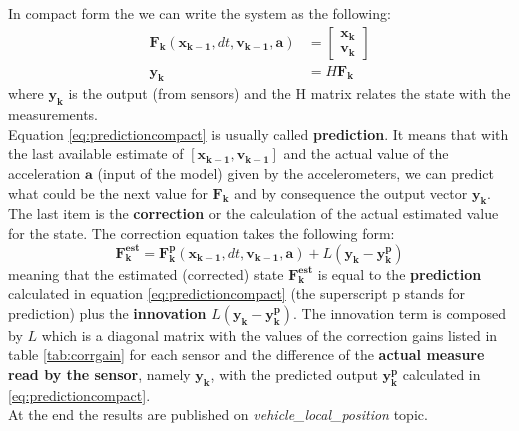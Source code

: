 \noindent
In compact form the we can write the system as the following:
\begin{equation}
	\begin{aligned}
	\boldsymbol{F_k}(\boldsymbol{x_{k-1}}, dt ,\boldsymbol{v_{k-1}}, \boldsymbol{a})& = \begin{bmatrix}\boldsymbol{x_k}\\\boldsymbol{v_k}\end{bmatrix}\\
	\boldsymbol{y_k}& = H \boldsymbol{F_k}
	\end{aligned}
	\label{eq:predictioncompact}
	\end{equation}
where $\boldsymbol{y_k}$ is the output  (from sensors) and the H matrix relates the state with the measurements. \\

\noindent
Equation \eqref{eq:predictioncompact} is usually called \textbf{prediction}. It means that with the last available estimate of  $[\boldsymbol{x_{k-1}},\boldsymbol{v_{k-1}}]$ and the actual value of the acceleration $\boldsymbol{a}$ (input of the model) given by the accelerometers, we can predict what could be the next value for $\boldsymbol{F_k}$ and by consequence the output vector $\boldsymbol{y_k}$. \\

\noindent
The last item is the \textbf{correction} or the calculation of the actual estimated value for the state. The correction equation takes the following form:
\begin{equation}
	\boldsymbol{F_k^{est}} = \boldsymbol{F_k^p}(\boldsymbol{x_{k-1}}, dt ,\boldsymbol{v_{k-1}}, \boldsymbol{a}) + L(\boldsymbol{y_k} - \boldsymbol{y_k^p})
	\label{eq:observer}
\end{equation}
meaning that the estimated (corrected) state $\boldsymbol{F_k^{est}}$ is equal to the \textbf{prediction} calculated in equation \eqref{eq:predictioncompact} (the superscript p stands for prediction) plus the \textbf{innovation} $L(\boldsymbol{y_k} - \boldsymbol{y_k^p})$. The innovation term is composed by $L$ which is a diagonal matrix with the values of the correction gains listed in table \ref{tab:corrgain} for each sensor and the difference of the \textbf{actual measure read by the sensor}, namely $\boldsymbol{y_k}$, with the predicted output $\boldsymbol{y_k^p}$ calculated in \eqref{eq:predictioncompact}. \\

\noindent
At the end the results are  published on \textit{vehicle\_local\_position} topic.

